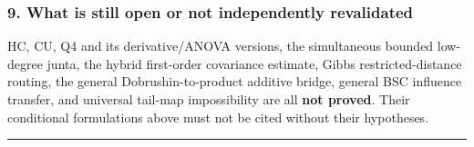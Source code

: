 \subsubsection{9. What is still open or not independently revalidated}\label{what-is-still-open-or-not-independently-revalidated}

HC, CU, Q4 and its derivative/ANOVA versions, the simultaneous bounded low-degree junta, the hybrid first-order covariance estimate, Gibbs restricted-distance routing, the general Dobrushin-to-product additive bridge, general BSC influence transfer, and universal tail-map impossibility are all \textbf{not proved}. Their conditional formulations above must not be cited without their hypotheses.

\begin{center}\rule{0.5\linewidth}{0.5pt}\end{center}
